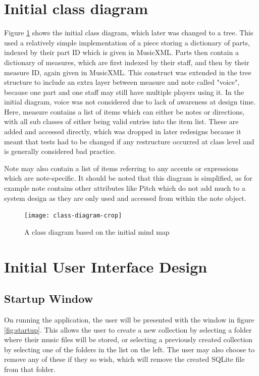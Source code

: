 \begin{appendices}
\section{Initial class diagram}
Figure \ref{fig:handclass} shows the initial class diagram, which later was changed to a tree. This used a relatively simple implementation of a piece storing a dictionary of parts, indexed by their part ID which is given in MusicXML. Parts then contain a dictionary of measures, which are first indexed by their staff, and then by their measure ID, again given in MusicXML. This construct was extended in the tree structure to include an extra layer between measure and note called "voice", because one part and one staff may still have multiple players using it. In the initial diagram, voice was not considered due to lack of awareness at design time. Here, measure contains a list of items which can either be notes or directions, with all sub classes of either being valid entries into the item list. These are added and accessed directly, which was dropped in later redesigns because it meant that tests had to be changed if any restructure occurred at class level and is generally considered bad practice. 

Note may also contain a list of items referring to any accents or expressions which are note-specific. It should be noted that this diagram is simplified, as for example note contains other attributes like Pitch which do not add much to a system design as they are only used and accessed from within the note object.
\begin{figure}[H]
\centering
\texttt{[image: class-diagram-crop]}
\caption{A class diagram based on the initial mind map}
\label{fig:handclass}
\end{figure}

\section{Initial User Interface Design}
\subsection{Startup Window}
On running the application, the user will be presented with the window in figure \ref{fig:startup}. This allows the user to create a new collection by selecting a folder where their music files will be stored, or selecting a previously created collection by selecting one of the folders in the list on the left. The user may also choose to remove any of these if they so wish, which will remove the created SQLite file from that folder.


\end{appendices}
